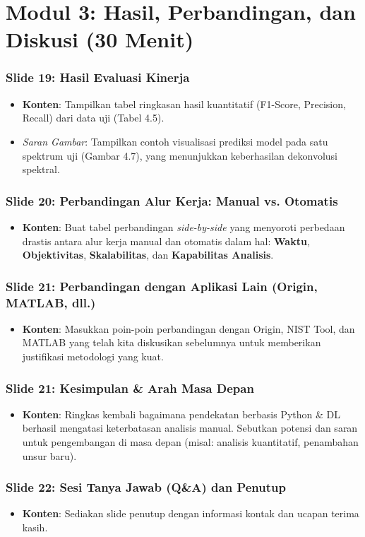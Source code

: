 \documentclass[12pt, a4paper]{article}
\begin{document}
\section{Modul 3: Hasil, Perbandingan, dan Diskusi (30 Menit)}

\subsubsection*{Slide 19: Hasil Evaluasi Kinerja}
\begin{itemize}
    \item \textbf{Konten}: Tampilkan tabel ringkasan hasil kuantitatif (F1-Score, Precision, Recall) dari data uji (Tabel 4.5).
    \item \textit{Saran Gambar}: Tampilkan contoh visualisasi prediksi model pada satu spektrum uji (Gambar 4.7), yang menunjukkan keberhasilan dekonvolusi spektral.
\end{itemize}

\subsubsection*{Slide 20: Perbandingan Alur Kerja: Manual vs. Otomatis}
\begin{itemize}
    \item \textbf{Konten}: Buat tabel perbandingan \textit{side-by-side} yang menyoroti perbedaan drastis antara alur kerja manual dan otomatis dalam hal: \textbf{Waktu}, \textbf{Objektivitas}, \textbf{Skalabilitas}, dan \textbf{Kapabilitas Analisis}.
\end{itemize}

\subsubsection*{Slide 21: Perbandingan dengan Aplikasi Lain (Origin, MATLAB, dll.)}
\begin{itemize}
    \item \textbf{Konten}: Masukkan poin-poin perbandingan dengan Origin, NIST Tool, dan MATLAB yang telah kita diskusikan sebelumnya untuk memberikan justifikasi metodologi yang kuat.
\end{itemize}

\subsubsection*{Slide 21: Kesimpulan \& Arah Masa Depan}
\begin{itemize}
    \item \textbf{Konten}: Ringkas kembali bagaimana pendekatan berbasis Python \& DL berhasil mengatasi keterbatasan analisis manual. Sebutkan potensi dan saran untuk pengembangan di masa depan (misal: analisis kuantitatif, penambahan unsur baru).
\end{itemize}

\subsubsection*{Slide 22: Sesi Tanya Jawab (Q\&A) dan Penutup}
\begin{itemize}
    \item \textbf{Konten}: Sediakan slide penutup dengan informasi kontak dan ucapan terima kasih.
\end{itemize}
\end{document}
